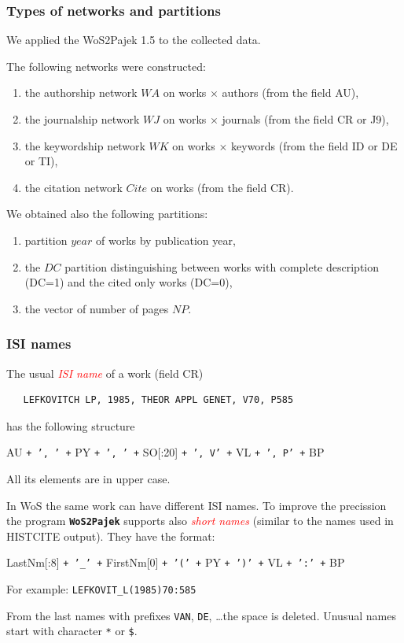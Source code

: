 \documentclass[hyperref={pdfstartview={FitBH -32768},
                         pdfpagemode=FullScreen,
                         plainpages=false,
                         colorlinks=true}
              ]{beamer}
\newcommand{\WoSPajek}{\texttt{\textbf{WoS2Pajek}}\xspace}
\newcommand{\keyw}[1]{\textcolor{red}{\emph{#1}}}
\begin{document}
\begin{frame}[fragile]
\frametitle{Types of networks and partitions}
\small
We applied the WoS2Pajek 1.5  to the collected data.\medskip

The following networks were constructed: 
\begin{enumerate}
\item the authorship network $WA$ on works $\times$ authors  (from the field AU), 
\item the journalship network $WJ$ on  works $\times$ journals  (from the field CR or J9), 
\item the keywordship network $WK$ on works  $\times$ keywords (from the field ID or DE or TI), 
\item the citation network $Cite$ on works (from the field CR).
\end{enumerate}

We obtained also the following partitions: 
\begin{enumerate}
\item partition $year$ of works by publication year, 
\item the $DC$ partition distinguishing between works with complete description (DC=1) and the cited only works (DC=0),
\item the vector of number of pages $NP$.
\end{enumerate}
\medskip

\end{frame}

\begin{frame}[fragile]
\frametitle{ISI names}
\footnotesize
The usual \keyw{ISI name} of a work (field CR)
\begin{verbatim}
   LEFKOVITCH LP, 1985, THEOR APPL GENET, V70, P585
\end{verbatim}
has the following structure\medskip

   AU \texttt{+ ', ' +} PY \texttt{+ ', ' +} SO[:20] \texttt{+ ', V' +} VL  \texttt{+ ', P' +} BP\medskip

\noindent All its elements are in upper case.

In WoS the same work can have different ISI names. To improve
the precission the program \WoSPajek supports also
\keyw{short names} (similar to the names used in HISTCITE output).
They have the format:\medskip

   LastNm[:8] \texttt{+ '\_' +} FirstNm[0] \texttt{+ '(' +} PY
   \texttt{+ ')' +} VL \texttt{+ ':' +} BP\medskip

For example: \quad
\texttt{LEFKOVIT\_L(1985)70:585}

From the last names with prefixes \texttt{VAN}, \texttt{DE}, \ldots the space is deleted.
Unusual names start with character \texttt{*} or \texttt{\$}.

\end{frame}
\end{document}
